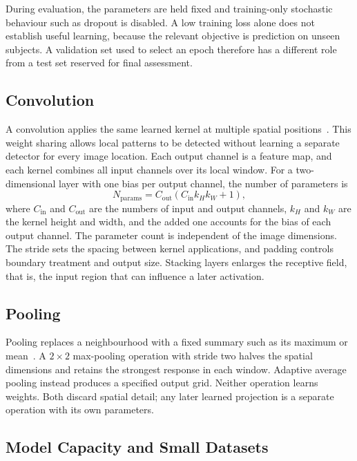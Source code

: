 During evaluation, the parameters are held fixed and training-only stochastic behaviour such as dropout is disabled. A low training loss alone does not establish useful learning, because the relevant objective is prediction on unseen subjects. A validation set used to select an epoch therefore has a different role from a test set reserved for final assessment.

\subsection{Convolution}
\label{sec:convolution}

A convolution applies the same learned kernel at multiple spatial positions~\cite{lecun1998}. This weight sharing allows local patterns to be detected without learning a separate detector for every image location. Each output channel is a feature map, and each kernel combines all input channels over its local window. For a two-dimensional layer with one bias per output channel, the number of parameters is
\begin{equation}
	N_{\mathrm{params}}=C_{\mathrm{out}}
	(C_{\mathrm{in}}k_Hk_W+1),
	\label{eq:conv-params}
\end{equation}
where $C_{\mathrm{in}}$ and $C_{\mathrm{out}}$ are the numbers of input and output channels, $k_H$ and $k_W$ are the kernel height and width, and the added one accounts for the bias of each output channel. The parameter count is independent of the image dimensions. The stride sets the spacing between kernel applications, and padding controls boundary treatment and output size. Stacking layers enlarges the receptive field, that is, the input region that can influence a later activation.

\subsection{Pooling}
\label{sec:pooling}

Pooling replaces a neighbourhood with a fixed summary such as its maximum or mean~\cite{lecun1998,goodfellow2016}. A $2\times2$ max-pooling operation with stride two halves the spatial dimensions and retains the strongest response in each window. Adaptive average pooling instead produces a specified output grid. Neither operation learns weights. Both discard spatial detail; any later learned projection is a separate operation with its own parameters.

\subsection{Model Capacity and Small Datasets}
\label{sec:capacity}

